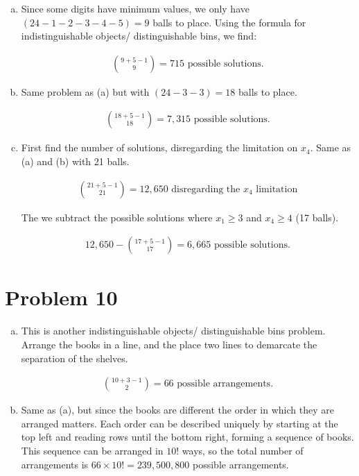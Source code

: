 \documentclass[11pt]{article}
\begin{document}
	\begin{enumerate}[(a)]
	\item
		Since some digits have minimum values, we only have $(24-1-2-3-4-5) = 9$ balls to place. Using the formula for indistinguishable objects/
		distinguishable bins, we find:
		
		\begin{align*}
		\binom{9+5-1}{9} = 715 \text{ possible solutions.}
		\end{align*}
		
	\item
		Same problem as (a) but with $(24-3-3)=18$ balls to place.
		
		\begin{align*}
		\binom{18+5-1}{18} = 7,315 \text{ possible solutions.}
		\end{align*}
	
	\item
		First find the number of solutions, disregarding the limitation on $x_4$. Same as (a) and (b) with 21 balls.
		
		\begin{align*}
		\binom{21+5-1}{21} = 12,650 \text{ disregarding the } x_4 \text{ limitation}
		\end{align*}
		
		The we subtract the possible solutions where $x_1 \ge 3$ and $x_4 \ge 4$ (17 balls).
		
		\begin{align*}
		12,650 - \binom{17+5-1}{17} = 6,665 \text{ possible solutions.}
		\end{align*}
	\end{enumerate}
	
\section*{Problem 10}
	\begin{enumerate}[(a)]
	\item
		This is another indistinguishable objects/ distinguishable bins problem. Arrange the books in a line, and the place two lines to demarcate 
		the separation of the shelves.
		
		\begin{align*}
		\binom{10+3-1}{2} = 66 \text{ possible arrangements.}
		\end{align*}
	
	\item
		Same as (a), but since the books are different the order in which they are arranged matters. Each order can be described uniquely by 
		starting at the top left and reading rows until the bottom right, forming a sequence of books. This sequence can be arranged in $10!$ ways, 
		so the total number of arrangements is $66 \times 10! = 239,500,800$ possible arrangements.
	\end{enumerate}
	
\end{document}
